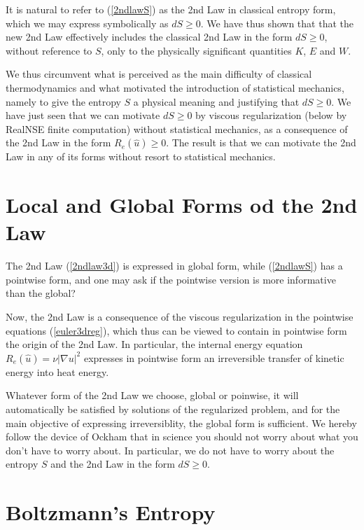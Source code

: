 It is natural to refer to (\ref{2ndlawS}) as the 2nd Law in classical
entropy form, which we may express symbolically as $dS\ge 0$. We 
have thus shown that that the new 2nd Law effectively includes the classical 
2nd Law in the form $dS\ge 0$, without reference to $S$,   
only to the physically significant quantities $K$, $E$ and $W$. 

We thus circumvent what is perceived as the
main difficulty of classical thermodynamics and what motivated the
introduction of statistical mechanics, namely
to give the entropy $S$ a physical meaning and justifying  
that $dS\ge 0$. We have just seen that we can motivate
$dS\ge 0$ by viscous regularization (below by RealNSE finite computation) 
without statistical mechanics,
as a consequence of the 2nd Law in the form $R_e(\hat u)\ge 0$.
The result is that we can motivate the 2nd Law in any of its forms
without resort to statistical mechanics.

\section{Local and Global Forms od the 2nd Law}

The 2nd Law (\ref{2ndlaw3d}) is expressed in global form,
while (\ref{2ndlawS}) has a pointwise form, and one may ask if 
the pointwise version is more informative than the global?
 
Now, the 2nd Law is a consequence of the viscous regularization
in the pointwise equations (\ref{euler3dreg}), which thus
can be viewed to contain in pointwise form the origin of the 2nd Law.
In particular, the internal energy equation
$R_e(\hat u)=\nu \vert\nabla u\vert^2$ expresses in pointwise form
an irreversible transfer of kinetic energy into heat energy.

Whatever form of the 2nd Law we choose, global or poinwise,
it will automatically be satisfied by solutions of the regularized problem,
and for the main objective of expressing irreversiblity, the global
form is sufficient. We hereby follow the device of
Ockham that in science you should not worry about
what you don't have to worry about. In particular, we do not have to 
worry about the entropy $S$ and the 2nd Law in the form $dS\ge 0$.
  


\section{Boltzmann's Entropy}

